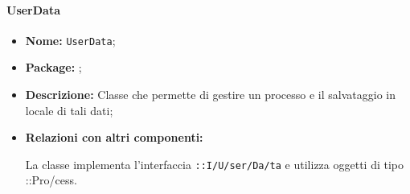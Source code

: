 \paragraph{UserData}
\begin{flushleft}
\begin{itemize}
\item \textbf{Nome:} \texttt{UserData};
\item \textbf{Package:} \texttt{\modelUser{}};
\item \textbf{Descrizione:} Classe che permette di gestire un processo e il salvataggio in locale di tali dati;
\item \textbf{Relazioni con altri componenti:}
\begin{sloppypar}
La classe implementa l'interfaccia \texttt{\iModelUser{}::I\fshyp{}U\fshyp{}ser\fshyp{}Da\fshyp{}ta} e utilizza oggetti di tipo \texttt{\model{}}::Pro\fshyp{}cess.
\end{sloppypar}
\end{itemize}
\end{flushleft}